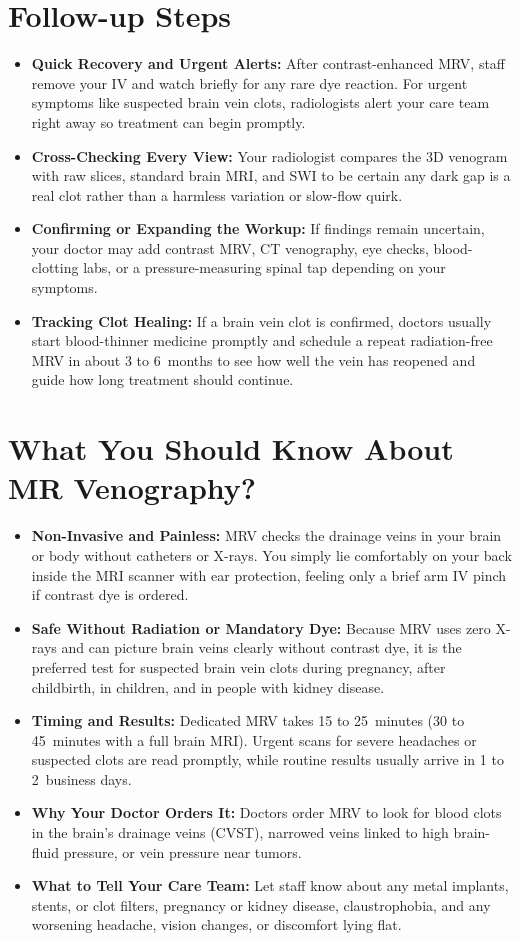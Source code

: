 \section{Follow-up Steps}
\begin{itemize}
\item \textbf{Quick Recovery and Urgent Alerts:} After contrast-enhanced MRV, staff remove your IV and watch briefly for any rare dye reaction. For urgent symptoms like suspected brain vein clots, radiologists alert your care team right away so treatment can begin promptly.
\item \textbf{Cross-Checking Every View:} Your radiologist compares the 3D venogram with raw slices, standard brain MRI, and SWI to be certain any dark gap is a real clot rather than a harmless variation or slow-flow quirk.
\item \textbf{Confirming or Expanding the Workup:} If findings remain uncertain, your doctor may add contrast MRV, CT venography, eye checks, blood-clotting labs, or a pressure-measuring spinal tap depending on your symptoms.
\item \textbf{Tracking Clot Healing:} If a brain vein clot is confirmed, doctors usually start blood-thinner medicine promptly and schedule a repeat radiation-free MRV in about 3 to 6~months to see how well the vein has reopened and guide how long treatment should continue.
\end{itemize}

\section{What You Should Know About MR Venography?}
\begin{itemize}
\item \textbf{Non-Invasive and Painless:} MRV checks the drainage veins in your brain or body without catheters or X-rays. You simply lie comfortably on your back inside the MRI scanner with ear protection, feeling only a brief arm IV pinch if contrast dye is ordered.
\item \textbf{Safe Without Radiation or Mandatory Dye:} Because MRV uses zero X-rays and can picture brain veins clearly without contrast dye, it is the preferred test for suspected brain vein clots during pregnancy, after childbirth, in children, and in people with kidney disease.
\item \textbf{Timing and Results:} Dedicated MRV takes 15 to 25~minutes (30 to 45~minutes with a full brain MRI). Urgent scans for severe headaches or suspected clots are read promptly, while routine results usually arrive in 1 to 2~business days.
\item \textbf{Why Your Doctor Orders It:} Doctors order MRV to look for blood clots in the brain's drainage veins (CVST), narrowed veins linked to high brain-fluid pressure, or vein pressure near tumors.
\item \textbf{What to Tell Your Care Team:} Let staff know about any metal implants, stents, or clot filters, pregnancy or kidney disease, claustrophobia, and any worsening headache, vision changes, or discomfort lying flat.
\end{itemize}

